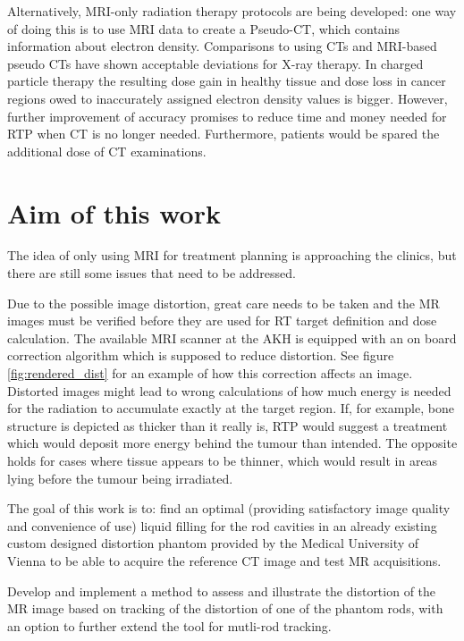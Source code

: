 Alternatively, MRI-only radiation therapy protocols are being developed:
one way of doing this is to use MRI data to create a Pseudo-CT, which contains information about electron density.
Comparisons to using CTs and MRI-based pseudo CTs have shown acceptable deviations for X-ray therapy.
In charged particle therapy the resulting dose gain in healthy tissue and dose loss in cancer regions owed to inaccurately assigned electron density values is bigger.
However, further improvement of accuracy promises to reduce time and money needed for RTP when CT is no longer needed.
Furthermore, patients would be spared the additional dose of CT examinations.  \cite{Rank2013, Stanescu2006, Jonsson2010, Greer2015, Chen2004}


\section{Aim of this work}
The idea of only using MRI for treatment planning is approaching the clinics, but there are still some issues that need to be addressed.

Due to the possible image distortion, great care needs to be taken and the MR images must be verified before they are used for RT target definition and dose calculation.
The available MRI scanner at the AKH is equipped with an on board correction algorithm which is supposed to reduce distortion.
See figure \ref{fig:rendered_dist} for an example of how this correction affects an image.
Distorted images might lead to wrong calculations of how much energy is needed for the radiation to accumulate exactly at the target region.
If, for example, bone structure is depicted as thicker than it really is, RTP would suggest a treatment which would deposit more energy behind the tumour than intended.
The opposite holds for cases where tissue appears to be thinner, which would result in areas lying before the tumour being irradiated.

The goal of this work is to:
find an optimal (providing satisfactory image quality and convenience of use) liquid filling for the rod cavities in an already existing custom designed distortion phantom provided by the Medical University of Vienna to be able to acquire the reference CT image and test MR acquisitions.

Develop and implement a method to assess and illustrate the distortion of the MR image based on tracking of the distortion of one of the phantom rods, with an option to further extend the tool for mutli-rod tracking.

